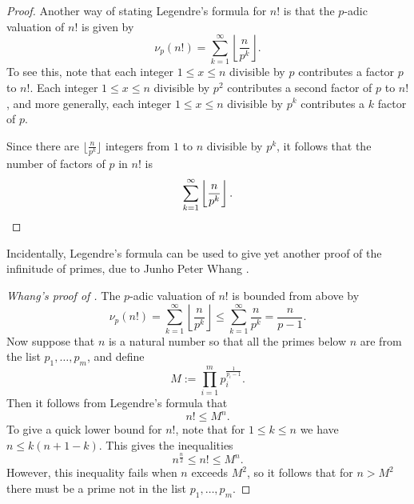\begin{proof}
  Another way of stating Legendre's formula for $n!$ is that the $p$-adic valuation of $n!$ is given by
  \begin{equation*}
    \nu_p(n!) = \sum_{k=1}^\infty\left\lfloor\frac{n}{p^k}\right\rfloor.
  \end{equation*}
  To see this, note that each integer $1\leq x \leq n$ divisible by $p$ contributes a factor $p$ to $n!$. Each integer $1\leq x\leq n$ divisible by $p^2$ contributes a second factor of $p$ to $n!$, and more generally, each integer $1\leq x \leq n$ divisible by $p^k$ contributes a $k$\supth{} factor of $p$.

  Since there are $\bigl\lfloor\frac{n}{p^k}\bigr\rfloor$ integers from $1$ to $n$ divisible by $p^k$, it follows that the number of factors of $p$ in $n!$ is
  \begin{equation*}
    \sum_{k=1}^\infty\left\lfloor\frac{n}{p^k}\right\rfloor.\qedhere
  \end{equation*}
\end{proof}

Incidentally, Legendre's formula can be used to give yet another proof of the infinitude of primes, due to Junho Peter Whang \cite{whang2010}.

\begin{proof}[Whang's proof of ]
  The $p$-adic valuation of $n!$ is bounded from above by
  \begin{equation*}
    \nu_p(n!)= \sum_{k=1}^{\infty}\left\lfloor\frac{n}{p^k}\right\rfloor \leq \sum_{k=1}^{\infty}\frac{n}{p^k}=\frac{n}{p-1}.
  \end{equation*}
  Now suppose that $n$ is a natural number so that all the primes below $n$ are from the list $p_1,\ldots,p_m$, and define
  \begin{equation*}
    M := \prod_{i=1}^mp_i^{\frac{1}{p_i-1}}.
  \end{equation*}
  Then it follows from Legendre's formula that
  \begin{equation*}
    n!\leq M^n.
  \end{equation*}
  To give a quick lower bound for $n!$, note that for $1\leq k\leq n$ we have $n\leq k(n+1-k)$. This gives the inequalities
  \begin{equation*}
    n^{\frac{n}{2}}\leq n! \leq M^n.
  \end{equation*}
  However, this inequality fails when $n$ exceeds $M^2$, so it follows that for $n>M^2$ there must be a prime not in the list $p_1,\ldots,p_m$.
\end{proof}

